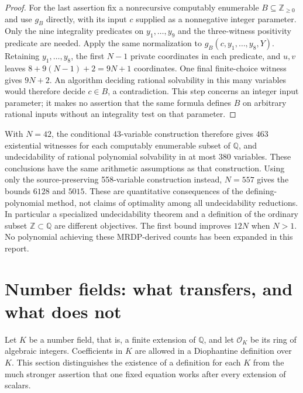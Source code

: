 \documentclass[11pt]{article}
\theoremstyle{definition}
\newcommand{\Q}{\mathbb Q}
\newcommand{\Z}{\mathbb Z}
\begin{document}
\begin{proof}
For the last assertion fix a nonrecursive computably enumerable
$B\subseteq\mathbb Z_{\ge0}$ and use $g_B$ directly, with its
input $c$ supplied as a nonnegative integer parameter. Only the nine
integrality predicates on $y_1,\ldots,y_9$ and the three-witness
positivity predicate are needed. Apply the same normalization to
$g_B(c,y_1,\ldots,y_8,Y)$. Retaining $y_1,\ldots,y_8$, the first
$N-1$ private coordinates in each predicate, and $u,v$ leaves
$8+9(N-1)+2=9N+1$ coordinates. One final finite-choice witness
gives $9N+2$. An algorithm deciding rational solvability in this
many variables would
therefore decide $c\in B$, a contradiction. This step concerns an
integer input parameter; it makes no assertion that the same formula
defines $B$ on arbitrary rational inputs without an integrality test
on that parameter.
\end{proof}

With $N=42$, the conditional 43-variable construction therefore gives
$463$ existential witnesses for each computably enumerable subset of
$\Q$, and undecidability of rational polynomial solvability in at most
$380$ variables. These conclusions have the same arithmetic assumptions
as that construction. Using only the source-preserving 558-variable
construction instead, $N=557$ gives the bounds $6128$ and $5015$.
These are quantitative consequences of the defining-polynomial method,
not claims of optimality among all undecidability reductions. In
particular a specialized undecidability theorem and a definition of the
ordinary subset $\Z\subset\Q$ are different objectives. The first
bound improves $12N$ when $N>1$. No polynomial achieving these
MRDP-derived counts has been expanded in this report.



\section{Number fields: what transfers, and what does not}
\label{sec:number-fields}

Let $K$ be a number field, that is, a finite extension of $\mathbb Q$, and let
$\mathcal O_K$ be its ring of algebraic integers.  Coefficients in $K$ are
allowed in a Diophantine definition over $K$.  This section distinguishes
the existence of a definition for each $K$ from the much stronger assertion
that one fixed equation works after every extension of scalars.
\end{document}
